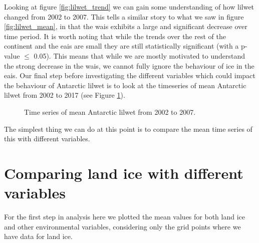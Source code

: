 \documentclass[../main.tex]{subfiles}
\begin{document}
Looking at figure \ref{fig:lilwet_trend} we can gain some understanding of how \gls{lilwet} changed from 2002 to 2007. This tells a similar story to what we saw in figure \ref{fig:lilwet_mean}, in that the \gls{wais} exhibits a large and significant decrease over time period. It is worth noting that while the trends over the rest of the continent and the \gls{eais} are small they are still statistically significant (with a p-value $\leq$ 0.05). This means that while we are mostly motivated to understand the strong decrease in the \gls{wais}, we cannot fully ignore the behaviour of ice in the \gls{eais}. Our final step before investigating the different variables which could impact the behaviour of Antarctic \gls{lilwet} is to look at the timeseries of mean Antarctic \gls{lilwet} from 2002 to 2017 (see Figure \ref{fig:lilwet_timeseries}).

\begin{figure}[hbt!]
    \centering
    \caption{Time series of mean Antarctic \gls{lilwet} from 2002 to 2007.}
    \label{fig:lilwet_timeseries}
\end{figure}


The simplest thing we can do at this point is to compare the mean time series of this with different variables.

\FloatBarrier
\section{Comparing land ice with different variables}
For the first step in analysis here we plotted the mean values for both land ice and other environmental variables, considering only the grid points where we have data for land ice.

\FloatBarrier
\end{document}
